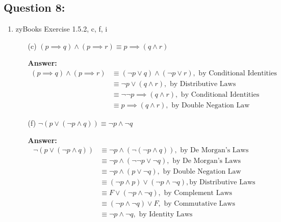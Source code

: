 \documentclass[12pt]{extreport}
\newcommand{\answer}[0]{\medskip \textbf{Answer:} \medskip}
\begin{document}
\subsection*{Question 8:}

\begin{enumerate}
    
    \item zyBooks Exercise 1.5.2, c, f, i
    
        \begin{enumerate}
            
            \item[(c)] \( (p \implies q) \land (p \implies r) \equiv p \implies (q \land r) \)
            
                \answer
                \begin{align*}
                    (p \implies q) \land (p \implies r) &\equiv (\neg p \lor q) \land (\neg p \lor r), \text{ by Conditional Identities} \\
                                                        &\equiv \neg p \lor (q \land r), \text{ by Distributive Laws} \\
                                                        &\equiv \neg \neg p \implies (q \land r), \text{ by Conditional Identities} \\
                                                        &\equiv p \implies (q \land r), \text{ by Double Negation Law}
                \end{align*}
            
            \item[(f)] \( \neg (p \lor (\neg p \land q)) \equiv \neg p \land \neg q \)
            
                \answer
                \begin{align*}
                    \neg (p \lor (\neg p \land q)) &\equiv \neg p \land (\neg (\neg p \land q)), \text{ by De Morgan's Laws} \\
                                                   &\equiv \neg p \land (\neg \neg p \lor \neg q), \text{ by De Morgan's Laws} \\
                                                   &\equiv \neg p \land (p \lor \neg q), \text{ by Double Negation Law} \\
                                                   &\equiv (\neg p \land p) \lor (\neg p \land \neg q), \text{by Distributive Laws} \\
                                                   &\equiv F \lor (\neg p \land \neg q), \text{ by Complement Laws} \\
                                                   &\equiv (\neg p \land \neg q) \lor F, \text{ by Commutative Laws} \\
                                                   &\equiv \neg p \land \neg q, \text{ by Identity Laws}
                \end{align*}


\end{enumerate}
\end{enumerate}
\end{document}
